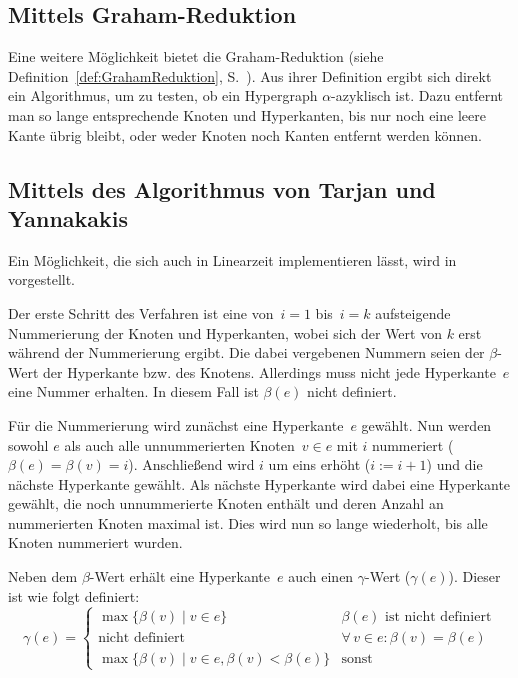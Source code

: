 \subsection{Mittels Graham-Reduktion}
Eine weitere Möglichkeit bietet die Graham-Reduktion (siehe Definition~\ref{def:GrahamReduktion}, S.~\pageref{def:GrahamReduktion}). Aus ihrer Definition ergibt sich direkt ein Algorithmus, um zu testen, ob ein Hypergraph $\alpha$-azyklisch ist. Dazu entfernt man so lange entsprechende Knoten und Hyperkanten, bis nur noch eine leere Kante übrig bleibt, oder weder Knoten noch Kanten entfernt werden können.

\subsection{Mittels des Algorithmus von Tarjan und Yannakakis}
Ein Möglichkeit, die sich auch in Linearzeit implementieren lässt, wird in \cite{LinearTimeAcylicityTest} vorgestellt.

Der erste Schritt des Verfahren ist eine von~$i=1$ bis~$i=k$ aufsteigende Nummerierung der Knoten und Hyperkanten, wobei sich der Wert von $k$ erst während der Nummerierung ergibt. Die dabei vergebenen Nummern seien der $\beta$-Wert der Hyperkante bzw. des Knotens. Allerdings muss nicht jede Hyperkante~$e$ eine Nummer erhalten. In diesem Fall ist $\beta(e)$ nicht definiert. 

Für die Nummerierung wird zunächst eine Hyperkante~$e$ gewählt. Nun werden sowohl $e$ als auch alle unnummerierten Knoten~$v \in e$ mit $i$ nummeriert ($\beta(e) = \beta(v) = i$). Anschließend wird $i$ um eins erhöht ($i:=i+1$) und die nächste Hyperkante gewählt. Als nächste Hyperkante wird dabei eine Hyperkante gewählt, die noch unnummerierte Knoten enthält und deren Anzahl an nummerierten Knoten maximal ist. Dies wird nun so lange wiederholt, bis alle Knoten nummeriert wurden.

Neben dem $\beta$-Wert erhält eine Hyperkante~$e$ auch einen $\gamma$-Wert ($\gamma(e)$). Dieser ist wie folgt definiert:
\[ \gamma(e) = \begin{cases}
\max \{ \beta(v) \mid v \in e \} & \text{$\beta(e)$ ist nicht definiert} \\ 
\text{nicht definiert} & \forall\, v \in e: \beta(v) = \beta(e) \\ 
\max \{ \beta(v) \mid v \in e, \beta(v) < \beta(e) \} & \text{sonst} 
\end{cases} \]



